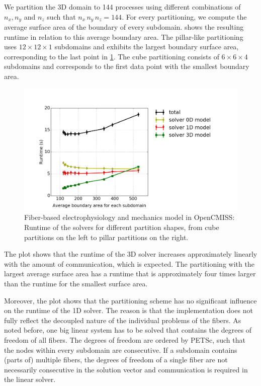 We partition the 3D domain to 144 processes using different combinations of $n_x,n_y$ and $n_z$ such that $n_x\,n_y\,n_z=144$. 
For every partitioning, we compute the average surface area of the boundary of every subdomain. 
 shows the resulting runtime in relation to this average boundary area.
The pillar-like partitioning uses $12 \times 12 \times 1$ subdomains and exhibits the largest boundary surface area, corresponding to the last point in \cref{fig:opencmiss_partition_shape}. The cube partitioning consists of $6 \times 6 \times 4$ subdomains and corresponds to the first data point with the smallest boundary area.

\begin{figure}
  \centering%
  \includegraphics[width=\textwidth]{images/results/studies/opencmiss_partition_shape.png}%
  \caption{Fiber-based electrophysiology and mechanics model in OpenCMISS: Runtime of the solvers for different partition shapes, from cube partitions on the left to pillar partitions on the right.\protect\footnotemark}%
  \label{fig:opencmiss_partition_shape}%
\end{figure}%

The plot shows that the runtime of the 3D solver increases approximately linearly with the amount of communication, which is expected.
The partitioning with the largest average surface area has a runtime that is approximately four times larger than the runtime for the smallest surface area.

Moreover, the plot shows that the partitioning scheme has no significant influence on the runtime of the 1D solver. The reason is that the implementation does not fully reflect the decoupled nature of the individual problems of the fibers. As noted before, one big linear system has to be solved that contains the degrees of freedom of all fibers. The degrees of freedom are ordered by PETSc, such that the nodes within every subdomain are consecutive. If a subdomain contains (parts of) multiple fibers, the degrees of freedom of a single fiber are not necessarily consecutive in the solution vector and communication is required in the linear solver.

